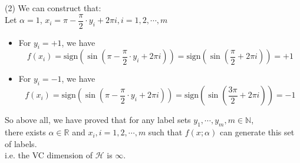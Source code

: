 (2) We can construct that:\\
Let $\alpha=1$, $x_i=\pi-\dfrac{\pi}{2}\cdot y_i+2\pi i, i=1,2,\cdots, m$\\
\begin{itemize}
    \item For $y_i=+1$, we have
    $$f(x_i)=\text{sign}(\sin(\pi-\dfrac{\pi}{2}\cdot y_i+2\pi i))=\text{sign}(\sin(\dfrac{\pi}{2}+2\pi i))=+1$$
    \item For $y_i=-1$, we have 
    $$f(x_i)=\text{sign}(\sin(\pi-\dfrac{\pi}{2}\cdot y_i+2\pi i))=\text{sign}(\sin(\dfrac{3\pi}{2}+2\pi i))=-1$$
\end{itemize}

So above all, we have proved that for any label sets $y_1, \cdots, y_m, m \in \mathbb{N}$, \\there exists $\alpha \in \mathbb{R}$ and $x_i, i=1,2, \cdots, m$ such that $f(x ; \alpha)$ can generate this set of labels.\\
i.e. the VC dimension of $\mathcal{H}$ is $\infty$.
